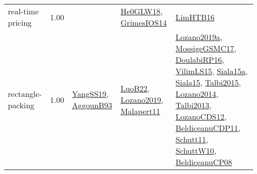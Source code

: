 {\begin{longtable}{p{3cm}r>{\raggedright\arraybackslash}p{6cm}>{\raggedright\arraybackslash}p{6cm}>{\raggedright\arraybackslash}p{8cm}}
\index{real-time pricing}\index{ApplicationAreas!real-time pricing}real-time pricing &  1.00 &  & \hyperref[detail:He0GLW18]{He0GLW18}, \hyperref[detail:GrimesIOS14]{GrimesIOS14} & \hyperref[detail:LimHTB16]{LimHTB16}\\
\index{rectangle-packing}\index{ApplicationAreas!rectangle-packing}rectangle-packing &  1.00 & \hyperref[detail:YangSS19]{YangSS19}, \hyperref[detail:AggounB93]{AggounB93} & \hyperref[detail:LuoB22]{LuoB22}, \hyperref[detail:Lozano2019]{Lozano2019}, \hyperref[detail:Malapert11]{Malapert11} & \hyperref[detail:Lozano2019a]{Lozano2019a}, \hyperref[detail:MossigeGSMC17]{MossigeGSMC17}, \hyperref[detail:DoulabiRP16]{DoulabiRP16}, \hyperref[detail:VilimLS15]{VilimLS15}, \hyperref[detail:Siala15a]{Siala15a}, \hyperref[detail:Siala15]{Siala15}, \hyperref[detail:Talbi2015]{Talbi2015}, \hyperref[detail:Lozano2014]{Lozano2014}, \hyperref[detail:Talbi2013]{Talbi2013}, \hyperref[detail:LozanoCDS12]{LozanoCDS12}, \hyperref[detail:BeldiceanuCDP11]{BeldiceanuCDP11}, \hyperref[detail:Schutt11]{Schutt11}, \hyperref[detail:SchuttW10]{SchuttW10}, \hyperref[detail:BeldiceanuCP08]{BeldiceanuCP08}\\

\end{longtable}}
